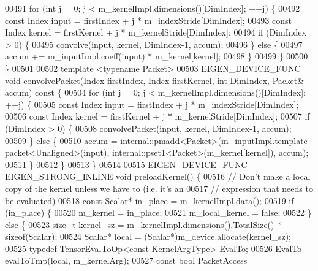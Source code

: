 \begin{DoxyCode}
00491     \textcolor{keywordflow}{for} (\textcolor{keywordtype}{int} j = 0; j < m\_kernelImpl.dimensions()[DimIndex]; ++j) \{
00492       \textcolor{keyword}{const} Index input = firstIndex + j * m\_indexStride[DimIndex];
00493       \textcolor{keyword}{const} Index kernel = firstKernel + j * m\_kernelStride[DimIndex];
00494       \textcolor{keywordflow}{if} (DimIndex > 0) \{
00495         convolve(input, kernel, DimIndex-1, accum);
00496       \} \textcolor{keywordflow}{else} \{
00497         accum += m\_inputImpl.coeff(input) * m\_kernel[kernel];
00498       \}
00499     \}
00500   \}
00501 
00502   \textcolor{keyword}{template} <\textcolor{keyword}{typename} Packet>
00503   EIGEN\_DEVICE\_FUNC \textcolor{keywordtype}{void} convolvePacket(Index firstIndex, Index firstKernel, \textcolor{keywordtype}{int} DimIndex, 
      \hyperlink{group___sparse_core___module}{Packet}& accum)\textcolor{keyword}{ const }\{
00504     \textcolor{keywordflow}{for} (\textcolor{keywordtype}{int} j = 0; j < m\_kernelImpl.dimensions()[DimIndex]; ++j) \{
00505       \textcolor{keyword}{const} Index input = firstIndex + j * m\_indexStride[DimIndex];
00506       \textcolor{keyword}{const} Index kernel = firstKernel + j * m\_kernelStride[DimIndex];
00507       \textcolor{keywordflow}{if} (DimIndex > 0) \{
00508         convolvePacket(input, kernel, DimIndex-1, accum);
00509       \} \textcolor{keywordflow}{else} \{
00510         accum = internal::pmadd<Packet>(m\_inputImpl.template packet<Unaligned>(input), 
      internal::pset1<Packet>(m\_kernel[kernel]), accum);
00511       \}
00512     \}
00513   \}
00514 
00515   EIGEN\_DEVICE\_FUNC EIGEN\_STRONG\_INLINE \textcolor{keywordtype}{void} preloadKernel() \{
00516     \textcolor{comment}{// Don't make a local copy of the kernel unless we have to (i.e. it's an}
00517     \textcolor{comment}{// expression that needs to be evaluated)}
00518     \textcolor{keyword}{const} Scalar* in\_place = m\_kernelImpl.data();
00519     \textcolor{keywordflow}{if} (in\_place) \{
00520       m\_kernel = in\_place;
00521       m\_local\_kernel = \textcolor{keyword}{false};
00522     \} \textcolor{keywordflow}{else} \{
00523       \textcolor{keywordtype}{size\_t} kernel\_sz = m\_kernelImpl.dimensions().TotalSize() * \textcolor{keyword}{sizeof}(Scalar);
00524       Scalar* local = (Scalar*)m\_device.allocate(kernel\_sz);
00525       \textcolor{keyword}{typedef} \hyperlink{class_eigen_1_1_tensor_eval_to_op}{TensorEvalToOp<const KernelArgType>} EvalTo;
00526       EvalTo evalToTmp(local, m\_kernelArg);
00527       \textcolor{keyword}{const} \textcolor{keywordtype}{bool} PacketAccess = 

\end{DoxyCode}
